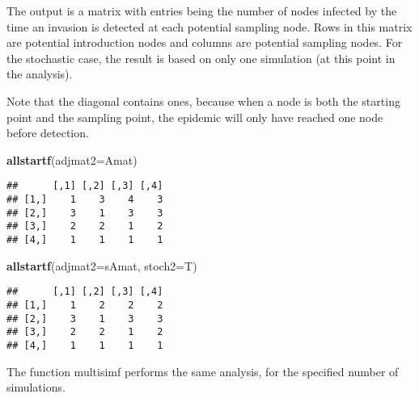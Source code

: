 \documentclass[]{article}
\newenvironment{Shaded}{\begin{snugshade}}{\end{snugshade}}
\newcommand{\KeywordTok}[1]{\textcolor[rgb]{0.13,0.29,0.53}{\textbf{#1}}}
\newcommand{\DataTypeTok}[1]{\textcolor[rgb]{0.13,0.29,0.53}{#1}}
\newcommand{\NormalTok}[1]{#1}
\begin{document}
The output is a matrix with entries being the number of nodes infected
by the time an invasion is detected at each potential sampling node.
Rows in this matrix are potential introduction nodes and columns are
potential sampling nodes. For the stochastic case, the result is based
on only one simulation (at this point in the analysis).

Note that the diagonal contains ones, because when a node is both the
starting point and the sampling point, the epidemic will only have
reached one node before detection.

\begin{Shaded}
\begin{Highlighting}[]
\KeywordTok{allstartf}\NormalTok{(}\DataTypeTok{adjmat2=}\NormalTok{Amat)}
\end{Highlighting}
\end{Shaded}

\begin{verbatim}
##      [,1] [,2] [,3] [,4]
## [1,]    1    3    4    3
## [2,]    3    1    3    3
## [3,]    2    2    1    2
## [4,]    1    1    1    1
\end{verbatim}

\begin{Shaded}
\begin{Highlighting}[]
\KeywordTok{allstartf}\NormalTok{(}\DataTypeTok{adjmat2=}\NormalTok{sAmat, }\DataTypeTok{stoch2=}\NormalTok{T)}
\end{Highlighting}
\end{Shaded}

\begin{verbatim}
##      [,1] [,2] [,3] [,4]
## [1,]    1    2    2    2
## [2,]    3    1    3    3
## [3,]    2    2    1    2
## [4,]    1    1    1    1
\end{verbatim}

The function multisimf performs the same analysis, for the specified
number of simulations.
\end{document}
